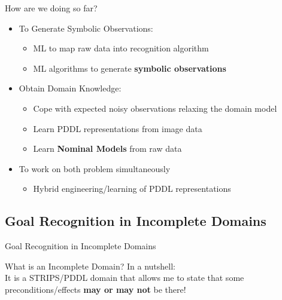 \documentclass[usenames,dvipsnames]{beamer}
\begin{document}
\begin{frame}[c]{How are we doing so far?}
	\begin{itemize}
		\item To Generate Symbolic Observations:
		\begin{itemize}
			\item ML to map raw data into recognition algorithm {\Large \color{red} \checkmark}
			\item ML algorithms to generate \textbf{symbolic observations}
		\end{itemize}
		\item Obtain Domain Knowledge:
		\begin{itemize}
			\item Cope with expected noisy observations relaxing the domain model
			\item Learn PDDL representations from image data
			\item Learn \textbf{Nominal Models} from raw data
		\end{itemize}
		\item To work on both problem simultaneously
		\begin{itemize}
			\item Hybrid engineering/learning of PDDL representations 
		\end{itemize}
	\end{itemize}
\end{frame}

\subsection{Goal Recognition in Incomplete Domains}

\begin{frame}[c]
	\begin{center}
		\Large{Goal Recognition in Incomplete Domains}
	\end{center}
\end{frame}

	\begin{frame}[c]{What is an Incomplete Domain?}
		In a nutshell: \\
			It is a STRIPS/PDDL domain that allows me to state that some preconditions/effects \textbf{may or may not} be there!
	\end{frame}
	
\end{document}

